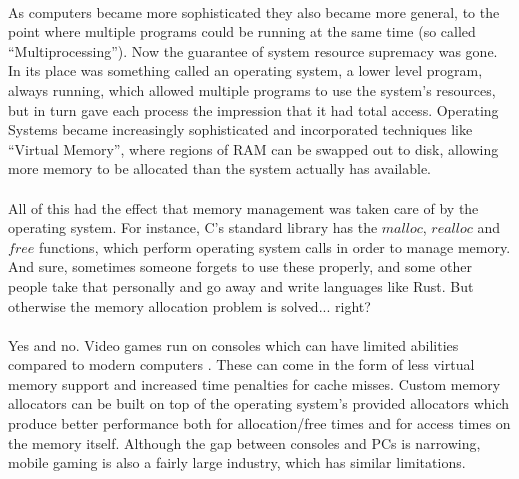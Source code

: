 \documentclass{article}
\begin{document}
\\
As computers became more sophisticated they also became more general, to the point where multiple programs could be running at the same time (so called ``Multiprocessing''). Now the guarantee of system resource supremacy was gone. In its place was something called an operating system, a lower level program, always running, which allowed multiple programs to use the system's resources, but in turn gave each process the impression that it had total access. Operating Systems became increasingly sophisticated and incorporated techniques like ``Virtual Memory'', where regions of RAM can be swapped out to disk, allowing more memory to be allocated than the system actually has available.\\
\\
All of this had the effect that memory management was taken care of by the operating system. For instance, C's standard library has the $malloc$, $realloc$ and $free$ functions, which perform operating system calls in order to manage memory. And sure, sometimes someone forgets to use these properly, and some other people take that personally and go away and write languages like Rust. But otherwise the memory allocation problem is solved... right?\\
\\
Yes and no. Video games run on consoles which can have limited abilities compared to modern computers \cite{10.5555/2621961}. These can come in the form of less virtual memory support and increased time penalties for cache misses. Custom memory allocators can be built on top of the operating system's provided allocators which produce better performance both for allocation/free times and for access times on the memory itself. Although the gap between consoles and PCs is narrowing, mobile gaming is also a fairly large industry, which has similar limitations.
\pagebreak
\end{document}
